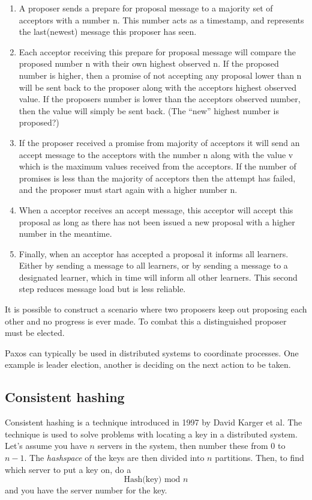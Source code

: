 \begin{enumerate}

\item A proposer sends a prepare for proposal message to a majority set of acceptors with a number n. This number acts as a timestamp, and represents the last(newest) message this proposer has seen. 
\item Each acceptor receiving this prepare for proposal message will compare the proposed number n with their own highest observed n. If the proposed number is higher, then a promise of not accepting any proposal lower than n will be sent back to the proposer along with the acceptors highest observed value. If the proposers number is lower than the acceptors observed number, then the value will simply be sent back. (The ``new'' highest number is proposed?)
\item If the proposer received a promise from majority of acceptors it will send an accept message to the acceptors with the number n along with the value v which is the maximum values received from the acceptors. If the number of promises is less than the majority of acceptors then the attempt has failed, and the proposer must start again with a higher number n.
\item When a acceptor receives an accept message, this acceptor will accept this proposal as long as there has not been issued a new proposal with a higher number in the meantime. 
\item Finally, when an acceptor has accepted a proposal it informs all learners. Either by sending a message to all learners, or by sending a message to a designated learner, which in time will inform all other learners. This second step reduces message load but is less reliable.

\end{enumerate}

It is possible to construct a scenario where two proposers keep out proposing each other and no progress is ever made. To combat this a distinguished proposer must be elected. 

Paxos can typically be used in distributed systems to coordinate processes. One example is leader election, another is deciding on the next action to be taken.

\subsection{Consistent hashing}
\label{sec:consistenthashing}
Consistent hashing is a technique introduced in 1997 by David Karger\cite{Karger97consistenthashing} et al.
The technique is used to solve problems with locating a key in a distributed system.
Let's assume you have $n$ servers in the system, then number these from $0$ to $n-1$.
The \emph{hashspace} of the keys are then divided into $n$ partitions. Then, to find which server to put a key on, do a $$\textrm{Hash(key) mod } n$$ and you have the server number for the key. 

